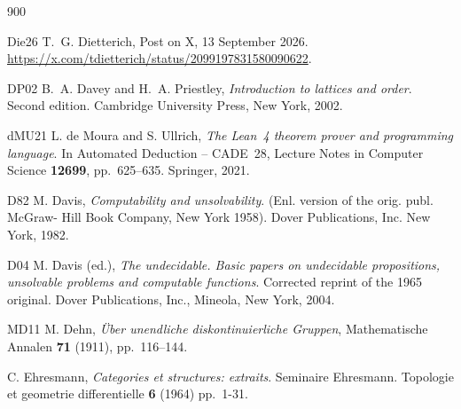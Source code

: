 \begin{thebibliography}{900}

%

\bibitem%
{Die26} T.~G. Dietterich, Post on X, 13 September 2026. \url{https://x.com/tdietterich/status/2099197831580090622}.

\bibitem%
{DP02} B.~A. Davey and H.~A. Priestley, \emph{Introduction to lattices and order}. Second edition. Cambridge University Press, New York, 2002.

\bibitem%
{dMU21} L. de Moura and S. Ullrich, \emph{The Lean~4 theorem prover and programming language}. In Automated Deduction -- CADE~28, Lecture Notes in Computer Science \textbf{12699}, pp.~625--635. Springer, 2021.

\bibitem%
{D82} M. Davis, \emph{Computability and unsolvability}. (Enl. version of the orig. publ. McGraw- Hill Book Company, New York 1958). Dover Publications, Inc. 
New York, 1982.

\bibitem%
{D04} M. Davis (ed.), \emph{The undecidable. Basic papers on undecidable propositions, unsolvable problems and computable functions}. Corrected reprint of the 1965 original. Dover Publications, Inc., Mineola, New York, 2004.


\bibitem%
{MD11} M. Dehn, \emph{\"{U}ber unendliche diskontinuierliche Gruppen}, Mathematische Annalen \textbf{71} (1911), pp.~116--144.

%

C. Ehresmann, \emph{Categories et structures: extraits}. Seminaire Ehresmann. Topologie et geometrie differentielle \textbf{6} (1964) pp.~1-31.


\end{thebibliography}
